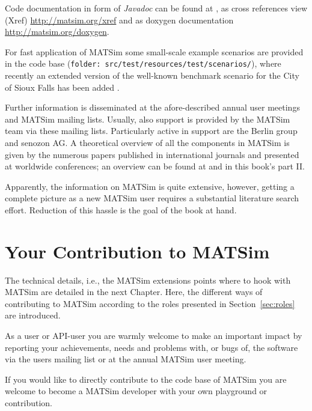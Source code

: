 Code documentation in form of \emph{Javadoc} can be found at \citet[][]{MATSIM-T-Javadoc_Webpage_2014}, as cross references view (Xref) \url{http://matsim.org/xref} and as doxygen documentation \url{http://matsim.org/doxygen}. %

For fast application of MATSim some small-scale example scenarios are provided in the code base (\lstinline|folder: src/test/resources/test/scenarios/|), where recently an extended version of the well-known benchmark scenario for the City of Sioux Falls has been added \citep[][]{ChakirovFourie_TechRep_FCL_2014}.

Further information is disseminated at the afore-described annual user meetings and MATSim mailing lists. Usually, also support is provided by the MATSim team via these mailing lists. Particularly active in support are the Berlin group and senozon AG. A theoretical overview of all the components in MATSim is given by the numerous papers published in international journals and presented at worldwide conferences; an overview can be found at \citep[][]{MATSIM-T-Publications_Webpage_2014} and in this book's part II.

Apparently, the information on MATSim is quite extensive, however, getting a complete picture as a new MATSim user requires a substantial literature search effort. Reduction of this hassle is the goal of the book at hand.

\section{Your Contribution to MATSim}
\label{sec:yourcontribution}
The technical details, i.e., the MATSim extensions points where to hook with MATSim are detailed in the next Chapter. Here, the different ways of contributing to MATSim according to the roles presented in Section~\ref{sec:roles} are introduced.

As a user or API-user you are warmly welcome to make an important impact by reporting your achievements, needs and problems with, or bugs of, the software via the users mailing list or at the annual MATSim user meeting. 

If you would like to directly contribute to the code base of MATSim you are welcome to become a MATSim developer with your own playground or contribution.

